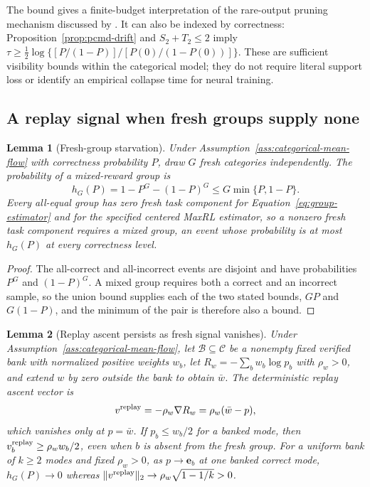 \documentclass{article}
\newcommand{\enforcehalffinalproseline}{%
  \setlength{\parfillskip}{0pt plus .20\linewidth}}
\newcommand{\1}{\mathbf 1}
\newtheorem{lemma}{Lemma}[section]
\theoremstyle{remark}
\theoremstyle{definition}
\theoremstyle{plain}
\begin{document}
The bound gives a finite-budget interpretation of the rare-output pruning
mechanism discussed by \citet[Section~4.2.5]{lochab2026ucpo}.
It can also be indexed by correctness: Proposition~\ref{prop:pcmd-drift}
and $S_2+T_2\le2$ imply
$\tau\ge\tfrac12\log\{[P/(1-P)]/[P(0)/(1-P(0))]\}$.
These are sufficient visibility bounds within the categorical model;
they do not require literal support loss or identify an empirical collapse
time for neural training.


\subsection{A replay signal when fresh groups supply none}
\label{app:theory-gradient-availability}

\begin{lemma}[Fresh-group starvation]
\enforcehalffinalproseline
\label{lem:replay-gradient-availability}
Under Assumption~\ref{ass:categorical-mean-flow} with correctness probability
$P$, draw $G$ fresh categories independently. The probability of a
mixed-reward group is
\[
 h_G(P)=1-P^G-(1-P)^G\le G\min\{P,1-P\}.
\]
Every all-equal group has zero fresh task component for
Equation~\eqref{eq:group-estimator} and for the specified centered MaxRL
estimator, so a nonzero fresh task component requires a mixed group, an event
whose probability is at most $h_G(P)$ at every correctness level.
\end{lemma}

\begin{proof}
\enforcehalffinalproseline
The all-correct and all-incorrect events are disjoint and have probabilities
$P^G$ and $(1-P)^G$. A mixed group requires both a correct and an incorrect
sample, so the union bound supplies each of the two stated bounds, $GP$ and
$G(1-P)$, and the minimum of the pair is therefore also a bound.
\end{proof}

\begin{lemma}[Replay ascent persists as fresh signal vanishes]
\enforcehalffinalproseline
\label{lem:replay-ascent}
Under Assumption~\ref{ass:categorical-mean-flow}, let
$\mathcal B\subseteq\mathcal C$ be a nonempty fixed verified bank with
normalized positive weights $w_b$, let $R_w=-\sum_b w_b\log p_b$ with
$\rho_w>0$, and extend $w$ by zero outside the bank to obtain $\bar w$. The
deterministic replay ascent vector is
\[
 v^{\rm replay}=-\rho_w\nabla R_w=\rho_w(\bar w-p),
\]
which vanishes only at $p=\bar w$. If $p_b\le w_b/2$ for a banked mode, then
$v^{\rm replay}_b\ge\rho_w w_b/2$, even when $b$ is absent from the fresh
group. For a uniform bank of $k\ge2$ modes and fixed $\rho_w>0$, as
$p\to\mathbf e_b$ at one banked correct mode, $h_G(P)\to0$ whereas
$\|v^{\rm replay}\|_2\to\rho_w\sqrt{1-1/k}>0$.
\end{lemma}
\end{document}
